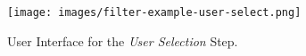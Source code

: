 \begin{figure}[h]
  \centering
  \texttt{[image: images/filter-example-user-select.png]}
  \caption{User Interface for the \emph{User Selection} Step.}\label{fig:simple_example_final_ui}
\end{figure}




